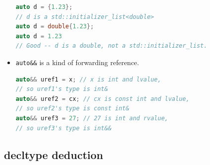 \documentclass[a4paper,11pt,twoside]{book}
\begin{document}
\begin{itemize}
\begin{lstlisting}[frame=single, language=c++]
auto d = {1.23};
// d is a std::initializer_list<double>
auto d = double{1.23};
auto d = 1.23
// Good -- d is a double, not a std::initializer_list.
\end{lstlisting}

	
	\item \texttt{auto\&\&} is a kind of forwarding reference.
\begin{lstlisting}[frame=single, language=c++]
auto&& uref1 = x; // x is int and lvalue,
// so uref1's type is int&
auto&& uref2 = cx; // cx is const int and lvalue,
// so uref2's type is const int&
auto&& uref3 = 27; // 27 is int and rvalue,
// so uref3's type is int&&
\end{lstlisting}

\end{itemize}



\subsection{decltype deduction}
\end{document}
